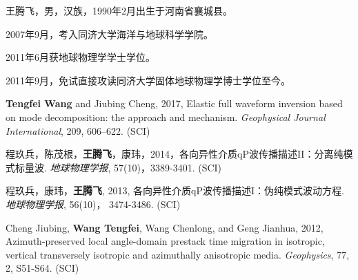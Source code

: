 \begin{resume}


  王腾飞，男，汉族，1990年2月出生于河南省襄城县。

  2007年9月，考入同济大学海洋与地球科学学院。

  2011年6月获地球物理学学士学位。

  2011年9月，免试直接攻读同济大学固体地球物理学博士学位至今。


  \begin{enumerate}[{[}1{]}]
	  \item {\bf{Tengfei Wang}}  and Jiubing Cheng, 2017, Elastic full waveform inversion
		  based on mode decomposition: the approach and mechanism. 
		  \emph{Geophysical Journal International}, 209, 606–622. (SCI)
	  \item
		  程玖兵，陈茂根，{\bf{王腾飞}}，康玮，2014，各向异性介质qP波传播描述II：分离纯模式标量波. \emph{地球物理学报},
	  57(10)，3389-3401. (SCI)
  \item  程玖兵，康玮，{\bf{王腾飞}}, 2013,
  各向异性介质qP波传播描述I：伪纯模式波动方程. \emph{地球物理学报},
	  56(10)， 3474-3486. (SCI)
  \item  Cheng Jiubing, {\bf{Wang Tengfei}}, Wang Chenlong, and Geng Jianhua, 2012, Azimuth-preserved local
	  angle-domain prestack time migration in isotropic, vertical transversely isotropic and
	  azimuthally anisotropic media. \emph{Geophysics}, 77, 2, S51-S64. (SCI)
  \end{enumerate}


\end{resume}
